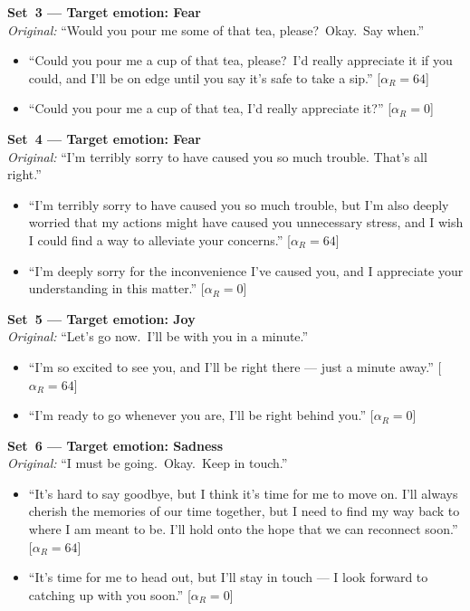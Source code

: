 \medskip\noindent\textbf{Set~3 --- Target emotion: Fear}\\
\textit{Original:} ``Would you pour me some of that tea, please?\ Okay.\ Say when.''
\begin{itemize}
  \item[Q16] ``Could you pour me a cup of that tea, please?\ I'd really appreciate it
    if you could, and I'll be on edge until you say it's safe to take a sip.''
    \hfill[$\alpha_R=64$]
  \item[Q17] ``Could you pour me a cup of that tea, I'd really appreciate it?''
    \hfill[$\alpha_R=0$]
\end{itemize}

\medskip\noindent\textbf{Set~4 --- Target emotion: Fear}\\
\textit{Original:} ``I'm terribly sorry to have caused you so much trouble. That's all right.''
\begin{itemize}
  \item[Q18] ``I'm terribly sorry to have caused you so much trouble, but I'm also
    deeply worried that my actions might have caused you unnecessary stress, and I wish
    I could find a way to alleviate your concerns.''
    \hfill[$\alpha_R=64$]
  \item[Q19] ``I'm deeply sorry for the inconvenience I've caused you, and I appreciate
    your understanding in this matter.''
    \hfill[$\alpha_R=0$]
\end{itemize}

\medskip\noindent\textbf{Set~5 --- Target emotion: Joy}\\
\textit{Original:} ``Let's go now.\ I'll be with you in a minute.''
\begin{itemize}
  \item[Q20] ``I'm so excited to see you, and I'll be right there --- just a minute
    away.''
    \hfill[$\alpha_R=64$]
  \item[Q21] ``I'm ready to go whenever you are, I'll be right behind you.''
    \hfill[$\alpha_R=0$]
\end{itemize}

\medskip\noindent\textbf{Set~6 --- Target emotion: Sadness}\\
\textit{Original:} ``I must be going.\ Okay.\ Keep in touch.''
\begin{itemize}
  \item[Q22] ``It's hard to say goodbye, but I think it's time for me to move on.
    I'll always cherish the memories of our time together, but I need to find my way
    back to where I am meant to be. I'll hold onto the hope that we can reconnect
    soon.''
    \hfill[$\alpha_R=64$]
  \item[Q23] ``It's time for me to head out, but I'll stay in touch --- I look forward
    to catching up with you soon.''
    \hfill[$\alpha_R=0$]
\end{itemize}

